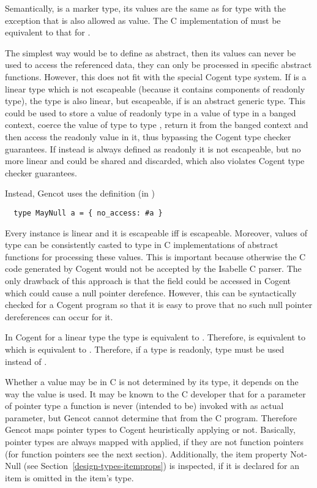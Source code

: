 Semantically,  is a marker type, its values are the same as for type  with the exception that 
 is also allowed as value. The C implementation of  must be equivalent to that for .

The simplest way would be to define  as abstract, then its values can never be used to access the referenced
data, they can only be processed in specific abstract functions. However, this does not fit with the special Cogent type system.
If  is a linear type which is not escapeable (because it contains components of readonly type), the type 
is also linear, but escapeable, if  is an abstract generic type. This could be used to store a value of readonly
type in a value of type  in a banged context, coerce the value of type  to type , return it from
the banged context and then access the readonly value in it, thus bypassing the Cogent type checker guarantees. If 
instead is always defined as readonly it is not escapeable, but no more linear and could be shared and discarded, which also
violates Cogent type checker guarantees. 

Instead, Gencot uses the definition (in )
\begin{verbatim}
  type MayNull a = { no_access: #a }
\end{verbatim}
Every instance  is linear and it is escapeable iff  is escapeable. Moreover, values of type 
can be consistently casted to type  in C implementations of abstract functions for processing these values. This is 
important because otherwise the C code generated by Cogent would not be accepted by the Isabelle C parser. The only
drawback of this approach is that the field  could be accessed in Cogent which could cause a null pointer
derefence. However, this can be syntactically checked for a Cogent program so that it is easy to prove that no such null
pointer dereferences can occur for it.

In Cogent for a linear type  the type  is equivalent to . Therefore,  is 
equivalent to  which is equivalent to . Therefore, if a type  is readonly,
type  must be used instead of .

Whether a value may be  in C is not determined by its type, it depends on the way the value is used. It may be known
to the C developer that for a parameter of pointer type a function is never (intended to be) invoked with  as actual
parameter, but Gencot cannot determine that from the C program. Therefore Gencot maps pointer types to Cogent heuristically 
applying  or not. Basically, pointer types are always mapped with  applied, if they are not 
function pointers (for function pointers see the next section). Additionally, the item property Not-Null (see 
Section~\ref{design-types-itemprops}) is inspected, if it is declared for an item  is omitted in the item's type. 

